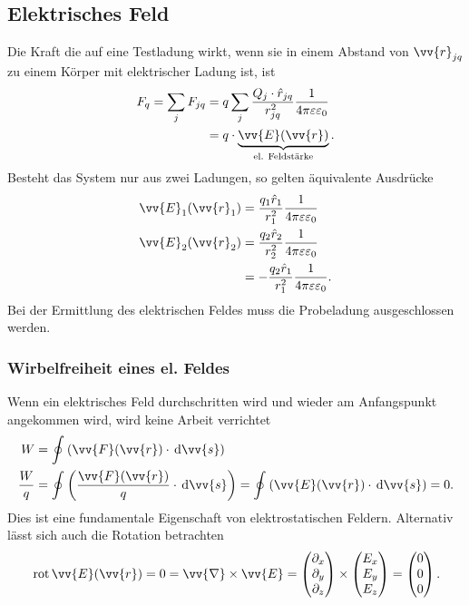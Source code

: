\documentclass[a4paper,12pt]{article}
\newcommand{\td}{\,\text{d}}
\begin{document}
\subsection{Elektrisches Feld}
Die Kraft die auf eine Testladung wirkt, wenn sie in einem Abstand von $\vv{r}_{jq}$ zu einem Körper mit elektrischer Ladung ist, ist
\begin{align*}
        F_q=\sum_{j}^{}F_{jq}&=q\sum_{j}^{}\dfrac{Q_j\cdot \hat{r}_{jq}}{r_{jq}^2}\dfrac{1}{4\pi \varepsilon \varepsilon _0}\\
                             &=q\cdot \underbrace{\vv{E}(\vv{r})}_{\,\text{el. Feldstärke}\,}
.\end{align*}
Besteht das System nur aus zwei Ladungen, so gelten äquivalente Ausdrücke
\begin{align*}
        \vv{E}_1(\vv{r}_1)&=\dfrac{q_1\hat{r}_1}{r_1^2}\dfrac{1}{4\pi \varepsilon \varepsilon _0}\\
        \vv{E}_2(\vv{r}_2)&=\dfrac{q_2\hat{r}_2}{r_2^2}\dfrac{1}{4\pi \varepsilon \varepsilon _0}\\
                          &=-\dfrac{q_2\hat{r}_1}{r_1^2}\dfrac{1}{4\pi \varepsilon \varepsilon _0}
.\end{align*}
Bei der Ermittlung des elektrischen Feldes muss die Probeladung ausgeschlossen werden.

\subsubsection{Wirbelfreiheit eines el. Feldes}
Wenn ein elektrisches Feld durchschritten wird und wieder am Anfangspunkt angekommen wird, wird keine Arbeit verrichtet
\begin{align*}
        W&=\oint_{}^{}\left(\vv{F}(\vv{r})\cdot \td \vv{s}\right)\\
        \dfrac{W}{q}&=\oint_{}^{}\left(\dfrac{\vv{F}(\vv{r})}{q}\cdot \td \vv{s}\right)=\oint_{}^{}\left(\vv{E}(\vv{r})\cdot \td \vv{s}\right)=0
.\end{align*}
Dies ist eine fundamentale Eigenschaft von elektrostatischen Feldern. Alternativ lässt sich auch die Rotation betrachten
\begin{align*}
        \,\text{rot}\,\vv{E}(\vv{r})=0=\vv{\nabla }\times \vv{E}=\begin{pmatrix}
                                            \partial_x\\\partial_y\\\partial_z
                                    \end{pmatrix}\times \begin{pmatrix}
                                            E_x\\E_y\\E_z
                                    \end{pmatrix}=\begin{pmatrix}
                                            0\\0\\0
                                    \end{pmatrix}
.\end{align*}
\end{document}
